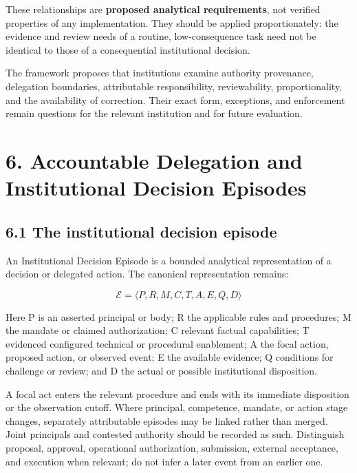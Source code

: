 \documentclass[
  10pt,
]{article}
\begin{document}
These relationships are \textbf{proposed analytical requirements}, not
verified properties of any implementation. They should be applied
proportionately: the evidence and review needs of a routine,
low-consequence task need not be identical to those of a consequential
institutional decision.

The framework proposes that institutions examine authority provenance,
delegation boundaries, attributable responsibility, reviewability,
proportionality, and the availability of correction. Their exact form,
exceptions, and enforcement remain questions for the relevant
institution and for future evaluation.

\section{6. Accountable Delegation and Institutional Decision
Episodes}\label{accountable-delegation-and-institutional-decision-episodes}

\subsection{6.1 The institutional decision
episode}\label{the-institutional-decision-episode}

An Institutional Decision Episode is a bounded analytical representation
of a decision or delegated action. The canonical representation remains:

\[
\mathcal{E}=\langle P,R,M,C,T,A,E,Q,D\rangle
\]

Here P is an asserted principal or body; R the applicable rules and
procedures; M the mandate or claimed authorization; C relevant factual
capabilities; T evidenced configured technical or procedural enablement;
A the focal action, proposed action, or observed event; E the available
evidence; Q conditions for challenge or review; and D the actual or
possible institutional disposition.

A focal act enters the relevant procedure and ends with its immediate
disposition or the observation cutoff. Where principal, competence,
mandate, or action stage changes, separately attributable episodes may
be linked rather than merged. Joint principals and contested authority
should be recorded as such. Distinguish proposal, approval, operational
authorization, submission, external acceptance, and execution when
relevant; do not infer a later event from an earlier one.
\end{document}
